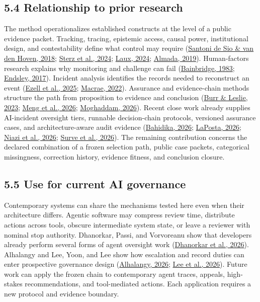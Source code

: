 \documentclass[11pt]{article}
\begin{document}
\subsection*{5.4 Relationship to prior research}
The method operationalizes established constructs at the level of a public evidence packet. Tracking, tracing, epistemic access, causal power, institutional design, and contestability define what control may require (\href{https://doi.org/10.3389/frobt.2018.00015}{Santoni de Sio \& van den Hoven, 2018}; \href{https://doi.org/10.1145/3630106.3659051}{Sterz et al., 2024}; \href{https://doi.org/10.1007/s00146-023-01777-z}{Laux, 2024}; \href{https://doi.org/10.1145/3322640.3326699}{Almada, 2019}). Human-factors research explains why monitoring and challenge can fail (\href{https://doi.org/10.1016/0005-1098(83)90046-8}{Bainbridge, 1983}; \href{https://doi.org/10.1177/0018720816681350}{Endsley, 2017}). Incident analysis identifies the records needed to reconstruct an event (\href{https://doi.org/10.1609/aies.v8i1.36596}{Ezell et al., 2025}; \href{https://doi.org/10.1111/risa.13850}{Macrae, 2022}). Assurance and evidence-chain methods structure the path from proposition to evidence and conclusion (\href{https://doi.org/10.1007/s43681-022-00178-0}{Burr \& Leslie, 2023}; \href{https://doi.org/10.48550/arXiv.2605.26340}{Meng et al., 2026}; \href{https://doi.org/10.48550/arXiv.2604.04103}{Moghaddam, 2026}). Recent close work already supplies AI-incident oversight tiers, runnable decision-chain protocols, versioned assurance cases, and architecture-aware audit evidence (\href{https://doi.org/10.14569/IJACSA.2026.0170502}{Bahidika, 2026}; \href{https://doi.org/10.1609/aaaiss.v8i1.42543}{LaPosta, 2026}; \href{https://doi.org/10.3390/automation7030096}{Niazi et al., 2026}; \href{https://doi.org/10.48550/arXiv.2606.21276}{Surve et al., 2026}). The remaining contribution concerns the declared combination of a frozen selection path, public case packets, categorical missingness, correction history, evidence fitness, and conclusion closure.
\subsection*{5.5 Use for current AI governance}
Contemporary systems can share the mechanisms tested here even when their architecture differs. Agentic software may compress review time, distribute actions across tools, obscure intermediate system state, or leave a reviewer with nominal stop authority. Dhanorkar, Passi, and Vorvoreanu show that developers already perform several forms of agent oversight work (\href{https://doi.org/10.1145/3805689.3812402}{Dhanorkar et al., 2026}). Alhalangy and Lee, Yoon, and Lee show how escalation and record duties can enter prospective governance design (\href{https://doi.org/10.3390/info17070694}{Alhalangy, 2026}; \href{https://doi.org/10.3390/systems14070849}{Lee et al., 2026}). Future work can apply the frozen chain to contemporary agent traces, appeals, high-stakes recommendations, and tool-mediated actions. Each application requires a new protocol and evidence boundary.
\end{document}
